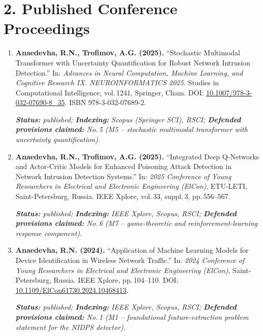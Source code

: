 \documentclass[11pt,a4paper]{article}
\newcommand{\pubmeta}[3]{%
  \par\smallskip\textit{\small\textbf{Status:} #1; \textbf{Indexing:} #2; \textbf{Defended provisions claimed:} #3.}\par}
\begin{document}
\vspace{-0.3cm}
\section*{2. Published Conference Proceedings}

\begin{enumerate}[leftmargin=*, itemsep=0.3em, resume]

\item \textbf{Anaedevha, R.N., Trofimov, A.G. (2025).} ``Stochastic Multimodal Transformer with Uncertainty Quantification for Robust Network Intrusion Detection.'' In: \textit{Advances in Neural Computation, Machine Learning, and Cognitive Research IX. NEUROINFORMATICS 2025.} Studies in Computational Intelligence, vol.\,1241, Springer, Cham. DOI: \href{https://doi.org/10.1007/978-3-032-07690-8_35}{10.1007/978-3-032-07690-8\_35}. ISBN 978-3-032-07689-2.
\pubmeta{published}{Scopus (Springer SCI), RSCI}{No.\,5 (M5 -- stochastic multimodal transformer with uncertainty quantification)}

\item \textbf{Anaedevha, R.N., Trofimov, A.G. (2025).} ``Integrated Deep Q-Networks and Actor-Critic Models for Enhanced Poisoning Attack Detection in Network Intrusion Detection Systems.'' In: \textit{2025 Conference of Young Researchers in Electrical and Electronic Engineering (ElCon)}, ETU-LETI, Saint-Petersburg, Russia. IEEE Xplore, vol.\,33, suppl.\,3, pp.\,556--567.
\pubmeta{published}{IEEE Xplore, Scopus, RSCI}{No.\,6 (M7 -- game-theoretic and reinforcement-learning response component)}

\item \textbf{Anaedevha, R.N. (2024).} ``Application of Machine Learning Models for Device Identification in Wireless Network Traffic.'' In: \textit{2024 Conference of Young Researchers in Electrical and Electronic Engineering (ElCon)}, Saint-Petersburg, Russia. IEEE Xplore, pp.\,104--110. DOI: \href{https://doi.org/10.1109/ElCon61730.2024.10468413}{10.1109/ElCon61730.2024.10468413}.
\pubmeta{published}{IEEE Xplore, Scopus, RSCI}{No.\,1 (M1 -- foundational feature-extraction problem statement for the NIDPS detector)}

\end{enumerate}

\vspace{-0.2cm}
\end{document}
